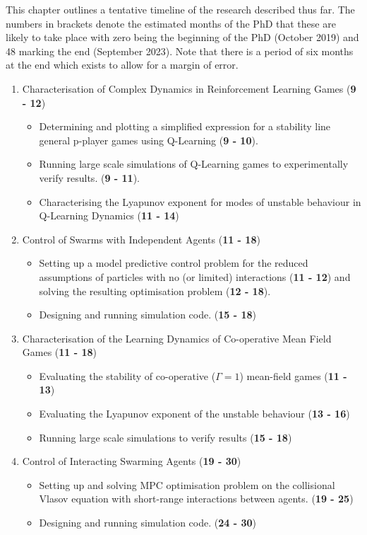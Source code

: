 \documentclass[.../main.tex]{subfiles}
\begin{document}
    
	This chapter outlines a tentative timeline of the research described thus far. The numbers in
	brackets denote the estimated months of the PhD that these are likely to take place with zero
	being the beginning of the PhD (October 2019) and 48 marking the end (September 2023). Note that
	there is a period of six months at the end which exists to allow for a margin of error.

	\begin{enumerate}
		\item Characterisation of Complex Dynamics in Reinforcement Learning Games (\textbf{9 - 12})
		\begin{itemize}
			\item Determining and plotting a simplified expression for a stability line general
			p-player games using Q-Learning (\textbf{9 - 10}).
			\item Running large scale simulations of Q-Learning games to experimentally verify
			results. (\textbf{9 - 11}).
			\item Characterising the Lyapunov exponent for modes of unstable behaviour in Q-Learning
			Dynamics (\textbf{11 - 14})
		\end{itemize}

		\item Control of Swarms with Independent Agents (\textbf{11 - 18})
		\begin{itemize}
			\item Setting up a model predictive control problem for the reduced assumptions of
			particles with no (or limited) interactions (\textbf{11 - 12}) and solving the resulting
			optimisation problem (\textbf{12 - 18}). 
			\item Designing and running simulation code. (\textbf{15 - 18})
		\end{itemize}

		\item Characterisation of the Learning Dynamics of Co-operative Mean Field Games (\textbf{11
				- 18})
		\begin{itemize}
			\item Evaluating the stability of co-operative ($\Gamma = 1$) mean-field games (\textbf{11 - 13})
			\item Evaluating the Lyapunov exponent of the unstable behaviour (\textbf{13 - 16})
			\item Running large scale simulations to verify results (\textbf{15 - 18})
		\end{itemize}

		\item Control of Interacting Swarming Agents (\textbf{19 - 30})
		\begin{itemize}
			\item Setting up and solving MPC optimisation problem on the collisional Vlasov
			equation with short-range interactions between agents. (\textbf{19 - 25})
			\item Designing and running simulation code. (\textbf{24 - 30})
		\end{itemize}


\end{enumerate}
\end{document}
